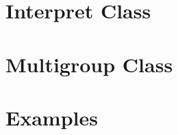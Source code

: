 \documentclass[../main.tex]{subfiles}
\begin{document}




\section{Interpret Class}

\section{Multigroup Class}

\section{Examples}
\end{document}
